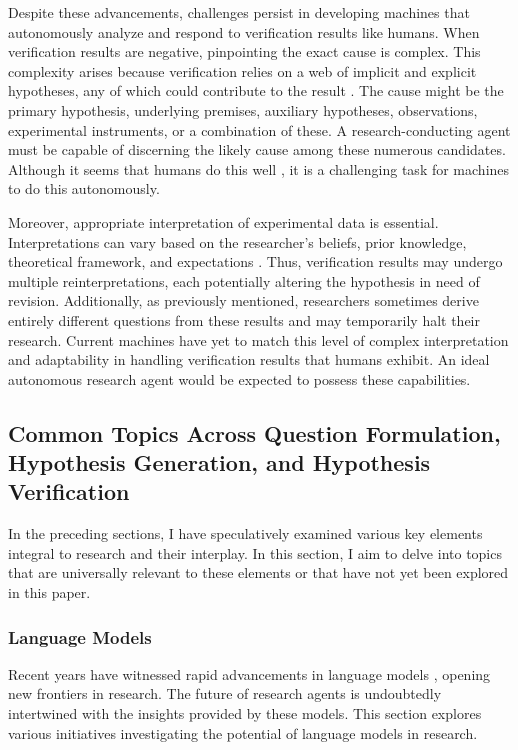 \documentclass{article}
\begin{document}
Despite these advancements, challenges persist in developing machines that autonomously analyze and respond to verification results like humans. When verification results are negative, pinpointing the exact cause is complex. This complexity arises because verification relies on a web of implicit and explicit hypotheses, any of which could contribute to the result \cite{sep-scientific-underdetermination}. The cause might be the primary hypothesis, underlying premises, auxiliary hypotheses, observations, experimental instruments, or a combination of these. A research-conducting agent must be capable of discerning the likely cause among these numerous candidates. Although it seems that humans do this well \cite{ren2023autonomous}, it is a challenging task for machines to do this autonomously.

Moreover, appropriate interpretation of experimental data is essential. Interpretations can vary based on the researcher's beliefs, prior knowledge, theoretical framework, and expectations \cite{hanson1965patterns}. Thus, verification results may undergo multiple reinterpretations, each potentially altering the hypothesis in need of revision. Additionally, as previously mentioned, researchers sometimes derive entirely different questions from these results and may temporarily halt their research. Current machines have yet to match this level of complex interpretation and adaptability in handling verification results that humans exhibit. An ideal autonomous research agent would be expected to possess these capabilities.

\subsection{Common Topics Across Question Formulation, Hypothesis Generation, and Hypothesis Verification}
In the preceding sections, I have speculatively examined various key elements integral to research and their interplay. In this section, I aim to delve into topics that are universally relevant to these elements or that have not yet been explored in this paper. 

\subsubsection{Language Models}
Recent years have witnessed rapid advancements in language models \cite{zhao2023survey}, opening new frontiers in research. The future of research agents is undoubtedly intertwined with the insights provided by these models. This section explores various initiatives investigating the potential of language models in research.
\end{document}
